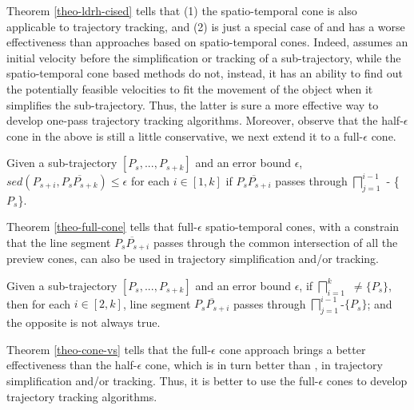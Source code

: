 Theorem \ref{theo-ldrh-cised} tells that (1) {the spatio-temporal cone is also applicable to trajectory tracking}, and (2) \ldrh is just a special case of and has a worse effectiveness than approaches based on spatio-temporal cones. Indeed, \ldrh assumes an initial velocity before the simplification or tracking of a sub-trajectory, while the spatio-temporal cone based methods do not, instead, it has an ability to find out the potentially feasible velocities to fit the movement of the object when it simplifies the sub-trajectory. Thus, the latter is sure a more effective way to develop one-pass trajectory tracking algorithms. 
%
Moreover, observe that the half-$\epsilon$ cone in the above is still a little conservative, we next extend it to a full-$\epsilon$ cone.%


\begin{theorem}
	\label{theo-full-cone}
	Given a sub-trajectory $[P_s,...,P_{s+k}]$ and an error bound $\epsilon$, $sed(P_{s+i}, \overline{P_sP_{s+k}})\le \epsilon$ for each $i \in [1,k]$ if $\overline{P_sP_{s+i}}$ passes through $\bigsqcap_{j=1}^{i-1}$ - \{$P_s$\}.
\end{theorem}

Theorem \ref{theo-full-cone} tells that full-$\epsilon$ spatio-temporal cones, with a constrain that the line segment $\overline{P_sP_{s+i}}$ passes through the common intersection of all the preview cones, can also be used in trajectory simplification and/or tracking. 

\begin{theorem}
	\label{theo-cone-vs}
	Given a sub-trajectory $[P_s,...,P_{s+k}]$ and an error bound $\epsilon$, if $\bigsqcap_{i=1}^{k}$ $\ne \{P_s\}$, then for each $i \in [2, k]$, line segment $\overline{P_sP_{s+i}}$ passes through $\bigsqcap_{j=1}^{i-1}$-$\{P_s\}$; and the opposite is not always true.
\end{theorem}


Theorem \ref{theo-cone-vs} tells that the full-$\epsilon$ cone approach brings a better effectiveness than the half-$\epsilon$ cone, which is in turn better than \ldrh, in trajectory simplification and/or tracking. Thus, it is better to use the full-$\epsilon$ cones to develop trajectory tracking algorithms.

